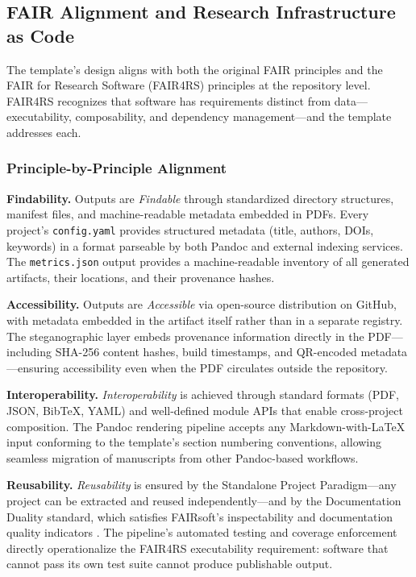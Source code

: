 \documentclass[
]{article}
\begin{document}
\newpage

\subsection{FAIR Alignment and Research Infrastructure as
Code}\label{fair-alignment-and-research-infrastructure-as-code}

The template's design aligns with both the original FAIR principles
\citep{wilkinson2016fair} and the FAIR for Research Software (FAIR4RS)
principles \citep{barker2022fair4rs} at the repository level. FAIR4RS
recognizes that software has requirements distinct from
data---executability, composability, and dependency management---and the
template addresses each.

\subsubsection{Principle-by-Principle
Alignment}\label{principle-by-principle-alignment}

\textbf{Findability.} Outputs are \emph{Findable} through standardized
directory structures, manifest files, and machine-readable metadata
embedded in PDFs. Every project's \texttt{config.yaml} provides
structured metadata (title, authors, DOIs, keywords) in a format
parseable by both Pandoc and external indexing services. The
\texttt{metrics.json} output provides a machine-readable inventory of
all generated artifacts, their locations, and their provenance hashes.

\textbf{Accessibility.} Outputs are \emph{Accessible} via open-source
distribution on GitHub, with metadata embedded in the artifact itself
rather than in a separate registry. The steganographic layer embeds
provenance information directly in the PDF---including SHA-256 content
hashes, build timestamps, and QR-encoded metadata---ensuring
accessibility even when the PDF circulates outside the repository.

\textbf{Interoperability.} \emph{Interoperability} is achieved through
standard formats (PDF, JSON, BibTeX, YAML) and well-defined module APIs
that enable cross-project composition. The Pandoc rendering pipeline
accepts any Markdown-with-LaTeX input conforming to the template's
section numbering conventions, allowing seamless migration of
manuscripts from other Pandoc-based workflows.

\textbf{Reusability.} \emph{Reusability} is ensured by the Standalone
Project Paradigm---any project can be extracted and reused
independently---and by the Documentation Duality standard, which
satisfies FAIRsoft's inspectability and documentation quality indicators
\citep{garijo2024fairsoft}. The pipeline's automated testing and
coverage enforcement directly operationalize the FAIR4RS executability
requirement: software that cannot pass its own test suite cannot produce
publishable output.
\end{document}
